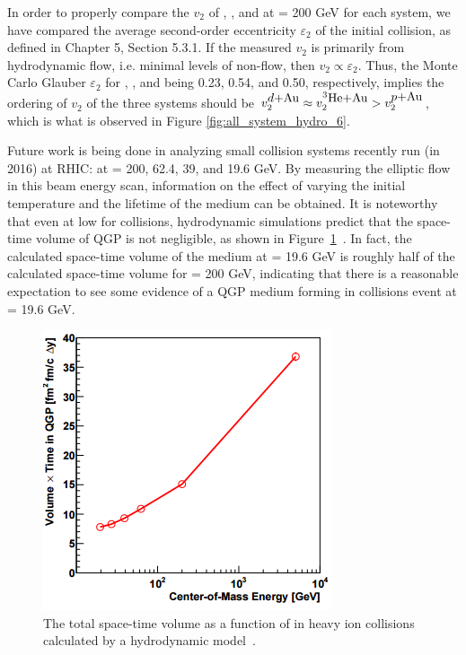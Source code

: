 In order to properly compare the $v_2$ of \pau, \dau, and \hau at \sqsn = 200 GeV for each system, we have compared the average second-order eccentricity $\varepsilon_2$ of the initial collision, as defined in Chapter 5, Section 5.3.1. If the measured $v_2$ is primarily from hydrodynamic flow, i.e. minimal levels of non-flow, then $v_2 \propto \varepsilon_2$. Thus, the Monte Carlo Glauber $\varepsilon_2$ for \pau, \dau, and \hau being 0.23, 0.54, and 0.50, respectively, implies the ordering of $v_2$ of the three systems should be $v_2^{\mbox{$d$+Au}} \approx v_2^{\mbox{$^3\text{He}$+Au}} > v_2^{\mbox{$p$+Au}}$, which is what is observed in Figure \ref{fig:all_system_hydro_6}.

Future work is being done in analyzing small collision systems recently run (in 2016) at RHIC: \dau at \sqsn = 200, 62.4, 39, and 19.6 GeV. By measuring the elliptic flow in this \dau beam energy scan, information on the effect of varying the initial temperature and the lifetime of the medium can be obtained. It is noteworthy that even at low \sqsn for \dau collisions, hydrodynamic simulations predict that the space-time volume of QGP is not negligible, as shown in Figure~\ref{fig:size_or_mediumcalc}~\cite{PhysRevC.93.044910}. In fact, the calculated space-time volume of the medium at \sqsn = 19.6 GeV is roughly half of the calculated space-time volume for \sqsn = 200 GeV, indicating that there is a reasonable expectation to see some evidence of a QGP medium forming in \dau collisions event at \sqsn = 19.6 GeV.

\begin{figure}[!ht]
\begin{center}
\includegraphics[width=0.5\linewidth]{figs/size_of_medium_calculation.png}
\caption{The total space-time volume as a function of \sqsn in heavy ion collisions calculated by a hydrodynamic model~\cite{PhysRevC.93.044910}.}
\label{fig:size_or_mediumcalc}
\end{center}
\end{figure}

